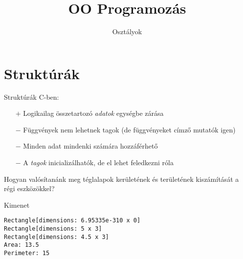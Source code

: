 \documentclass[usenames,dvipsnames,aspectratio=169]{beamer}
\title[OO Programozás - C++]{OO Programozás}
\subtitle{Osztályok}
\begin{document}
\begin{frame}[plain]
  \titlepage
  \logoalul
\end{frame}

\section{Struktúrák}

\begin{frame}
    Struktúrák C-ben:
    \begin{itemize}
        \item[$+$] Logikailag összetartozó \emph{adatok} egységbe zárása
        \item[$-$] Függvények nem lehetnek tagok (de függvényeket címző mutatók igen)
        \item[$-$] Minden adat mindenki számára hozzáférhető
        \item[$-$] A \emph{tagok} inicializálhatók, de el lehet feledkezni róla 
    \end{itemize}
    \vfill
    Hogyan valósítanánk meg téglalapok kerületének és területének kiszámítását a régi eszközökkel?
\end{frame}

\begin{frame}
    \begin{exampleblock}{}
        
    \end{exampleblock}
\end{frame}

\begin{frame}
    \begin{exampleblock}{}
        \scriptsize
        
    \end{exampleblock}
\end{frame}

\begin{frame}[fragile]
    \begin{exampleblock}{}
        \scriptsize
        
    \end{exampleblock}
    \begin{block}{Kimenet}
        \vspace{-.3cm}
        \tiny
        \begin{verbatim}
Rectangle[dimensions: 6.95335e-310 x 0]
Rectangle[dimensions: 5 x 3]
Rectangle[dimensions: 4.5 x 3]
Area: 13.5
Perimeter: 15
\end{verbatim}
    \vspace{-.3cm}
    \end{block}
\end{frame}
\end{document}
